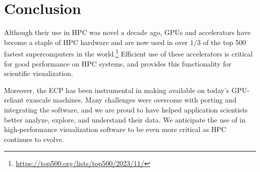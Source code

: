 \section{Conclusion}


Although their use in HPC was novel a decade ago, GPUs and accelerators have become a staple of HPC hardware and are now used in over $1/3$ of the top 500 fastest supercomputers in the world.\footnote{\url{https://top500.org/lists/top500/2023/11/}}
Efficient use of these accelerators is critical for good performance on HPC systems, and \vtkm provides this functionality for scientific visualization.

Moreover, the ECP has been instrumental in making \vtkm available on today's GPU-reliant exascale machines.
Many challenges were overcome with porting and integrating the software, and we are proud to have helped application scientists better analyze, explore, and understand their data.
We anticipate the use of \vtkm in high-performance visualization software to be even more critical as HPC continues to evolve.
